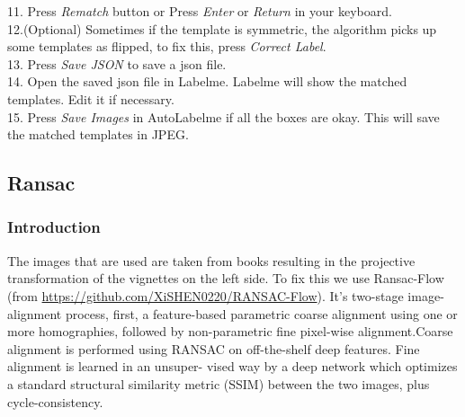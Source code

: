 \documentclass[12pt]{article}
\begin{document}
11. Press \textit{Rematch} button or Press \textit{Enter} or \textit{Return} in your keyboard.\\
12.(Optional) Sometimes if the template is symmetric, the algorithm picks up some templates as flipped, to fix this, press \textit{Correct Label}.\\
13. Press  \textit{Save JSON} to save a json file.\\
14. Open the saved json file in Labelme. Labelme will show the matched templates. Edit it if necessary.\\
15. Press \textit{Save Images} in AutoLabelme if all the boxes are okay. This will save the matched templates in JPEG.\\[2em]


\subsection{Ransac}
\subsubsection{Introduction}
The images that are used are taken from books resulting in the projective transformation of the vignettes on the left side. To fix this we use Ransac-Flow\cite{ransac} (from \href{https://github.com/XiSHEN0220/RANSAC-Flow}{https://github.com/XiSHEN0220/RANSAC-Flow}). It's two-stage image-alignment process, first, a feature-based parametric coarse alignment using one or more homographies, followed by non-parametric fine pixel-wise alignment.Coarse alignment is performed using RANSAC on off-the-shelf deep features. Fine alignment is learned in an unsuper- vised way by a deep network which optimizes a standard structural similarity metric (SSIM) between the two images, plus cycle-consistency.\\
\end{document}
